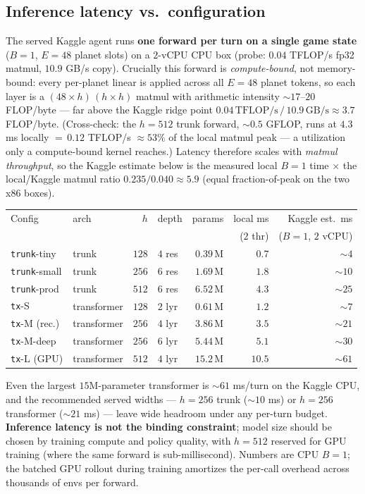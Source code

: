 \documentclass[11pt]{article}
\begin{document}
\subsection{Inference latency vs.\ configuration}\label{sec:latency}
The served Kaggle agent runs \textbf{one forward per turn on a single game state} ($B{=}1$, $E{=}48$
planet slots) on a $2$-vCPU CPU box (probe: $0.04$ TFLOP/s fp32 matmul, $10.9$ GB/s copy). Crucially this
forward is \emph{compute-bound}, not memory-bound: every per-planet linear is applied across all $E{=}48$
planet tokens, so each layer is a $(48{\times}h)\,(h{\times}h)$ matmul with arithmetic intensity
${\sim}17$--$20$ FLOP/byte --- far above the Kaggle ridge point
$0.04\,\text{TFLOP/s}\,/\,10.9\,\text{GB/s}\approx3.7$ FLOP/byte. (Cross-check: the $h{=}512$ trunk
forward, ${\sim}0.5$ GFLOP, runs at $4.3$ ms locally ${=}\,0.12$ TFLOP/s $\approx 53\%$ of the local
matmul peak --- a utilization only a compute-bound kernel reaches.) Latency therefore scales with
\emph{matmul throughput}, so the Kaggle estimate below is the measured local $B{=}1$ time $\times$ the
local/Kaggle matmul ratio $0.235/0.040\approx5.9$ (equal fraction-of-peak on the two x86 boxes).
\begin{center}\small
\begin{tabular}{@{}llrlrrr@{}}
\toprule
Config & arch & $h$ & depth & params & local ms & Kaggle est.\ ms \\
       &      &     &       &        & ($2$ thr) & ($B{=}1$, $2$ vCPU) \\
\midrule
\texttt{trunk}-tiny  & trunk       & $128$ & $4$ res & $0.39$\,M & $0.7$  & ${\sim}4$ \\
\texttt{trunk}-small & trunk       & $256$ & $6$ res & $1.69$\,M & $1.8$  & ${\sim}10$ \\
\texttt{trunk}-prod  & trunk       & $512$ & $6$ res & $6.52$\,M & $4.3$  & ${\sim}25$ \\
\texttt{tx}-S        & transformer & $128$ & $2$ lyr & $0.61$\,M & $1.2$  & ${\sim}7$ \\
\texttt{tx}-M (rec.) & transformer & $256$ & $4$ lyr & $3.86$\,M & $3.5$  & ${\sim}21$ \\
\texttt{tx}-M-deep   & transformer & $256$ & $6$ lyr & $5.44$\,M & $5.1$  & ${\sim}30$ \\
\texttt{tx}-L (GPU)  & transformer & $512$ & $4$ lyr & $15.2$\,M & $10.5$ & ${\sim}61$ \\
\bottomrule
\end{tabular}
\end{center}
\noindent Even the largest $15$M-parameter transformer is ${\sim}61$ ms/turn on the Kaggle CPU, and the
recommended served widths --- $h{=}256$ trunk (${\sim}10$ ms) or $h{=}256$ transformer (${\sim}21$ ms) ---
leave wide headroom under any per-turn budget. \textbf{Inference latency is not the binding constraint};
model size should be chosen by training compute and policy quality, with $h{=}512$ reserved for GPU
training (where the same forward is sub-millisecond). Numbers are CPU $B{=}1$; the batched GPU rollout
during training amortizes the per-call overhead across thousands of envs per forward.
\end{document}

